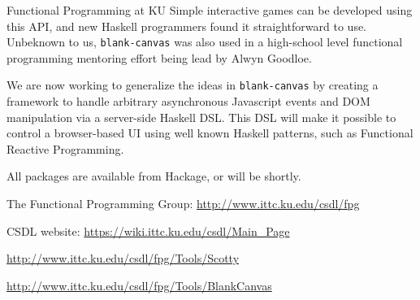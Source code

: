 \begin{hcarentry}{Functional Programming at KU}
Simple interactive games can be developed using this API,
and new Haskell programmers found it straightforward to use.
Unbeknown to us, {\tt blank-canvas} was also used in a high-school
level functional programming mentoring effort being lead by Alwyn Goodloe.

We are now working to generalize the ideas in {\tt blank-canvas} by
creating a framework to handle arbitrary asynchronous Javascript events
and DOM manipulation via a server-side Haskell DSL. This DSL will make it possible to control
a browser-based UI using well known Haskell patterns, such as Functional
Reactive Programming.

All packages are available from Hackage, or will be shortly.

\FurtherReading
\begin{compactitem}
\item   The Functional Programming Group:
    \url{http://www.ittc.ku.edu/csdl/fpg}
\item
  CSDL website: \url{https://wiki.ittc.ku.edu/csdl/Main_Page}
\item \url{http://www.ittc.ku.edu/csdl/fpg/Tools/Scotty}
\item \url{http://www.ittc.ku.edu/csdl/fpg/Tools/BlankCanvas}
\end{compactitem}
\end{hcarentry}
